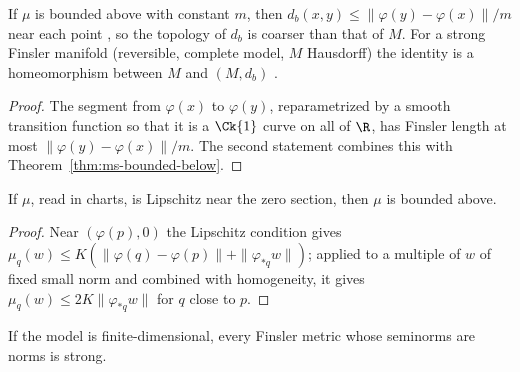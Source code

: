 \begin{theorem}
  \label{thm:ms-bounded-above}
  \leanok
  If $\mu$ is bounded above with constant $m$, then $d_b(x, y) \leq \|\varphi(y) - \varphi(x)\| / m$
  near each point \cite[(9.3)]{Lar26}, so the topology of $d_b$ is coarser than that of $M$. For a
  strong Finsler manifold (reversible, complete model, $M$ Hausdorff) the identity is a
  homeomorphism between $M$ and $(M, d_b)$ \cite[Cor.~9.1.9]{Lar26}.
\end{theorem}

\begin{proof}
  \leanok
  The segment from $\varphi(x)$ to $\varphi(y)$, reparametrized by a smooth transition function so
  that it is a $\Ck{1}$ curve on all of $\R$, has Finsler length at most
  $\|\varphi(y) - \varphi(x)\| / m$. The second statement combines this with
  Theorem~\ref{thm:ms-bounded-below}.
\end{proof}

\begin{lemma}
  \label{lem:ms-lipschitz}
  \leanok
  If $\mu$, read in charts, is Lipschitz near the zero section, then $\mu$ is bounded above.
\end{lemma}

\begin{proof}
  \leanok
  Near $(\varphi(p), 0)$ the Lipschitz condition gives
  $\mu_q(w) \leq K(\|\varphi(q) - \varphi(p)\| + \|\varphi_{*q} w\|)$; applied to a multiple of $w$ of
  fixed small norm and combined with homogeneity, it gives $\mu_q(w) \leq 2K \|\varphi_{*q} w\|$
  for $q$ close to $p$.
\end{proof}

\begin{theorem}
  \label{thm:ms-finite-dim}
  \leanok
  If the model is finite-dimensional, every Finsler metric whose seminorms are norms is strong.
\end{theorem}

